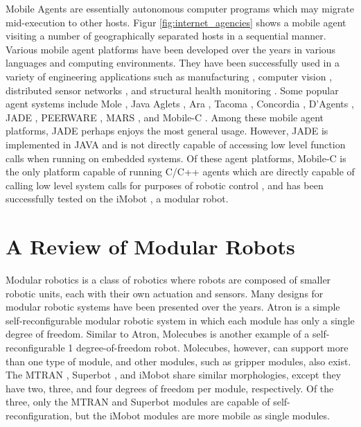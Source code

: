     Mobile Agents are essentially autonomous computer programs which may
    migrate mid-execution to other hosts. 
    Figur \ref{fig:internet_agencies} shows a mobile agent visiting a number
      of geographically separated hosts in a sequential manner. 
    Various mobile agent platforms have been developed over the years in
    various languages and computing environments. 
    They have been successfully used in a variety of engineering applications
    such as manufacturing \cite{DiStefano2008, Nestinger2010}, computer vision
    \cite{Nestinger2010b}, distributed sensor networks \cite{Fok2005, Wu2001},
      and structural health monitoring \cite{Taylor2009}. Some popular agent
      systems include Mole \cite{Baumann2002}, Java Aglets \cite{Lange1998},
      Ara \cite{Peine2002}, Tacoma \cite{Johnansen2002}, Concordia
      \cite{Wong1997}, D’Agents \cite{Gray2002}, JADE \cite{Bellifemine2008},
      PEERWARE \cite{Cugola2001}, MARS \cite{Cabri2000}, and
      Mobile-C \cite{Chen2006, Chou2010, mobilec}. 
    Among these mobile agent platforms, JADE perhaps enjoys the most general
      usage. 
    However, JADE is implemented in JAVA and is not directly capable of
      accessing low level function calls when running on embedded systems. 
    Of these agent platforms, Mobile-C is the only platform capable of running
    C/C++ agents which are directly capable of calling low level system calls
      for purposes of robotic control \cite{Nestinger2010}, and has been
      successfully tested on the iMobot \cite{Ryland2010, Ko2010}, a modular
      robot.


  \section{A Review of Modular Robots}

    Modular robotics is a class of robotics where robots are composed of smaller
      robotic units, each with their own actuation and sensors. 
    Many designs for modular robotic systems have been presented over the years. 
    Atron \cite{Jorgensen2004, Christensen2006} is a simple self-reconfigurable
      modular robotic system in which each module has only a single degree of
      freedom.
    Similar to Atron, Molecubes \cite{Zykov2007} is another example of a
    self-reconfigurable 1 degree-of-freedom robot. 
    Molecubes, however, can support more than one type of module, and other
      modules, such as gripper modules, also exist. 
    The MTRAN \cite{Murata2002}, Superbot \cite{Shen2006, Salemi2006}, and iMobot
      \cite{Ryland2010} share similar morphologies, except they have two, three, and
      four degrees of freedom per module, respectively. 
    Of the three, only the MTRAN and Superbot modules are capable of
      self-reconfiguration, but the iMobot modules are more mobile as single
      modules. 

